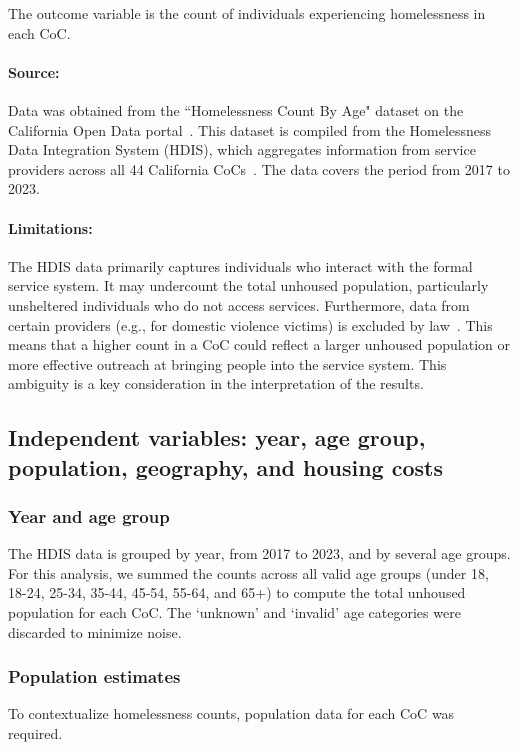 \documentclass[12pt]{scrartcl}
\begin{document}
The outcome variable is the count of individuals experiencing homelessness in each CoC.

\paragraph{Source:} Data was obtained from the ``Homelessness Count By Age" dataset on the California Open Data portal~\cite{caopendatahomelessness}. This dataset is compiled from the Homelessness Data Integration System (HDIS), which aggregates information from service providers across all 44 California CoCs~\cite{calich2025hdis}. The data covers the period from 2017 to 2023.

\paragraph{Limitations:} The HDIS data primarily captures individuals who interact with the formal service system. It may undercount the total unhoused population, particularly unsheltered individuals who do not access services. Furthermore, data from certain providers (e.g., for domestic violence victims) is excluded by law~\cite{calich2025hdis}. This means that a higher count in a CoC could reflect a larger unhoused population or more effective outreach at bringing people into the service system. This ambiguity is a key consideration in the interpretation of the results.

\subsection{Independent variables: year, age group, population, geography, and housing costs}

\subsubsection{Year and age group}
The HDIS data is grouped by year, from 2017 to 2023, and by several age groups. For this analysis, we summed the counts across all valid age groups (under 18, 18-24, 25-34, 35-44, 45-54, 55-64, and 65+) to compute the total unhoused population for each CoC. The `unknown' and `invalid' age categories were discarded to minimize noise.

\subsubsection{Population estimates}
To contextualize homelessness counts, population data for each CoC was required.
\end{document}
